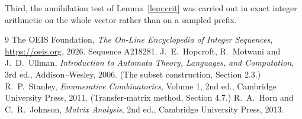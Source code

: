 \documentclass[11pt,a4paper]{article}
\theoremstyle{plain}
\theoremstyle{definition}
\begin{document}
Third, the annihilation test of Lemma~\ref{lem:crit} was carried out in exact integer
arithmetic on the whole vector rather than on a sampled prefix.

\begin{thebibliography}{9}
 The OEIS Foundation, \emph{The On-Line Encyclopedia of Integer
Sequences}, \url{https://oeis.org}, 2026. Sequence A218281.
 J.~E.~Hopcroft, R.~Motwani and J.~D.~Ullman, \emph{Introduction to Automata
Theory, Languages, and Computation}, 3rd ed., Addison--Wesley, 2006. (The subset
construction, Section 2.3.)
 R.~P.~Stanley, \emph{Enumerative Combinatorics}, Volume 1, 2nd ed.,
Cambridge University Press, 2011. (Transfer-matrix method, Section 4.7.)
 R.~A.~Horn and C.~R.~Johnson, \emph{Matrix Analysis}, 2nd ed., Cambridge
University Press, 2013.
\end{thebibliography}
\end{document}
